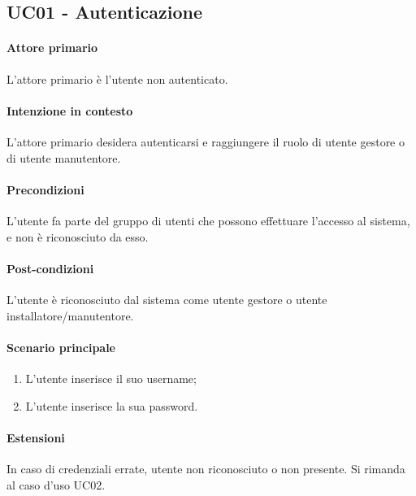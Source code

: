 \subsection{UC01 - Autenticazione}

\paragraph{Attore primario} L'attore primario è l'utente non autenticato.
\paragraph{Intenzione in contesto} L'attore primario desidera autenticarsi e raggiungere il ruolo di utente gestore o di utente manutentore.

\paragraph{Precondizioni} L'utente fa parte del gruppo di utenti che possono effettuare l'accesso al sistema, e non è riconosciuto da esso.

\paragraph{Post-condizioni} L'utente è riconosciuto dal sistema come utente gestore o utente installatore/manutentore.

\paragraph{Scenario principale}
\begin{enumerate}
    \item L'utente inserisce il suo username;
    \item L'utente inserisce la sua password.
\end{enumerate}


\paragraph{Estensioni} In caso di credenziali errate, utente non riconosciuto o non presente. Si rimanda al caso d'uso UC02.